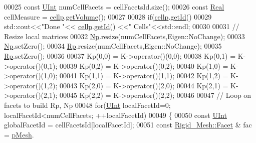 \begin{DoxyCode}
00025         \textcolor{keyword}{const} \hyperlink{namespaceFVCode3D_a4bf7e328c75d0fd504050d040ebe9eda}{UInt} numCellFacets  = cellFacetsId.size();
00026     \textcolor{keyword}{const} \hyperlink{namespaceFVCode3D_a40c1f5588a248569d80aa5f867080e83}{Real} cellMeasure    = \hyperlink{classFVCode3D_1_1local__MimeticOperator_a771437af467a250d8bcaf1d06372ae8e}{cellp}.\hyperlink{classFVCode3D_1_1Rigid__Mesh_1_1Cell_a60b0f29d67c90d2f8718b15a76885894}{getVolume}();
00027 
00028         \textcolor{keywordflow}{if}(\hyperlink{classFVCode3D_1_1local__MimeticOperator_a771437af467a250d8bcaf1d06372ae8e}{cellp}.\hyperlink{classFVCode3D_1_1Rigid__Mesh_1_1Cell_a2d86bd17fac84a6e521c8606cc8aeaaf}{getId}() %
00029                 std::cout<<\textcolor{stringliteral}{"Done "}<< \hyperlink{classFVCode3D_1_1local__MimeticOperator_a771437af467a250d8bcaf1d06372ae8e}{cellp}.\hyperlink{classFVCode3D_1_1Rigid__Mesh_1_1Cell_a2d86bd17fac84a6e521c8606cc8aeaaf}{getId}() <<\textcolor{stringliteral}{" Cells"}<<std::endl;
00030 
00031     \textcolor{comment}{// Resize local matrices}
00032     \hyperlink{classFVCode3D_1_1local__InnerProduct_ab1529332657085ba0189352ec057d75d}{Np}.resize(numCellFacets,Eigen::NoChange);
00033         \hyperlink{classFVCode3D_1_1local__InnerProduct_ab1529332657085ba0189352ec057d75d}{Np}.setZero();
00034     \hyperlink{classFVCode3D_1_1local__InnerProduct_a47cd5f267a0825f86a1dcce0958ff10f}{Rp}.resize(numCellFacets,Eigen::NoChange);
00035         \hyperlink{classFVCode3D_1_1local__InnerProduct_a47cd5f267a0825f86a1dcce0958ff10f}{Rp}.setZero();
00036         
00037         Kp(0,0) = K->operator()(0,0);
00038         Kp(0,1) = K->operator()(0,1);
00039         Kp(0,2) = K->operator()(0,2);
00040         Kp(1,0) = K->operator()(1,0);
00041         Kp(1,1) = K->operator()(1,1);
00042         Kp(1,2) = K->operator()(1,2);
00043     Kp(2,0) = K->operator()(2,0);
00044     Kp(2,1) = K->operator()(2,1);
00045     Kp(2,2) = K->operator()(2,2);
00046 
00047         \textcolor{comment}{// Loop on facets to build Rp, Np}
00048         \textcolor{keywordflow}{for}(\hyperlink{namespaceFVCode3D_a4bf7e328c75d0fd504050d040ebe9eda}{UInt} localFacetId=0; localFacetId<numCellFacets; ++localFacetId)
00049     \{
00050                 \textcolor{keyword}{const} \hyperlink{namespaceFVCode3D_a4bf7e328c75d0fd504050d040ebe9eda}{UInt} globalFacetId = cellFacetsId[localFacetId];
00051         \textcolor{keyword}{const} \hyperlink{classFVCode3D_1_1Rigid__Mesh_1_1Facet}{Rigid\_Mesh::Facet} & fac = \hyperlink{classFVCode3D_1_1local__MimeticOperator_aaedb6f563c6c3c28afadc1d3725b3f71}{pMesh}.

\end{DoxyCode}
